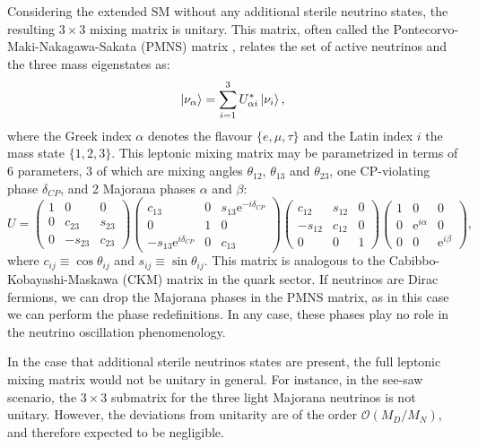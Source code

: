 Considering the extended SM without any additional sterile neutrino states, the  resulting $3 \times 3$ mixing matrix is unitary. This matrix, often called the Pontecorvo-Maki-Nakagawa-Sakata (PMNS) matrix \cite{Pontecorvo1957, Maki1962}, relates the set of active neutrinos and the three mass eigenstates as:
\begin{equation}\label{eq:nu_flavour_basis}
\ket{\nu_{\alpha}} = \sum_{i=1}^{3} U^{*}_{\alpha i} \ket{\nu_{i}},
\end{equation}
where the Greek index $\alpha$ denotes the flavour $\{e,\mu,\tau\}$ and the Latin index $i$ the mass state $\{1,2,3\}$. This leptonic mixing matrix may be parametrized in terms of 6 parameters, 3 of which are mixing angles $\theta_{12}$, $\theta_{13}$ and $\theta_{23}$, one CP-violating phase $\delta_{CP}$, and 2 Majorana phases $\alpha$ and $\beta$:
\begin{equation}\label{eq:pmns_matrix}
	U = \begin{pmatrix}1&0&0\\0&c_{23}&s_{23}\\0&-s_{23}&c_{23}\end{pmatrix} \begin{pmatrix}c_{13}&0&s_{13} \mathrm{e}^{-i\delta_{CP}}\\0&1&0\\-s_{13} \mathrm{e}^{i\delta_{CP}}&0&c_{13}\end{pmatrix} \begin{pmatrix}c_{12}&s_{12}&0\\-s_{12}&c_{12}&0\\0&0&1\end{pmatrix} \begin{pmatrix}1&0&0\\0&\mathrm{e}^{i\alpha}&0\\0&0&\mathrm{e}^{i\beta}\end{pmatrix},
\end{equation}
where $c_{ij} \equiv \cos \theta_{ij}$ and $s_{ij} \equiv \sin \theta_{ij}$. This matrix is analogous to the Cabibbo-Kobayashi-Maskawa (CKM) matrix in the quark sector. If neutrinos are Dirac fermions, we can drop the Majorana phases in the PMNS matrix, as in this case we can perform the phase redefinitions. In any case, these phases play no role in the neutrino oscillation phenomenology.

In the case that additional sterile neutrinos states are present, the full leptonic mixing matrix would not be unitary in general. For instance, in the see-saw scenario, the $3 \times 3$ submatrix for the three light Majorana neutrinos is not unitary. However, the deviations from unitarity are of the order $\mathcal{O}(M_{D}/M_{N})$, and therefore expected to be negligible.

